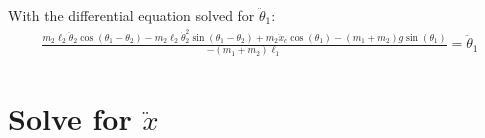 \documentclass[10pt]{article}
\begin{document}
    With the differential equation solved for $\ddot \theta_1$:
    \begin{equation}
        \begin{aligned}
            \frac{m_2\ell_2\ddot\theta_2\cos(\theta_1 - \theta_2)  -m_2\ell_2\dot\theta_2^2\sin(\theta_1-\theta_2)
            +   m_2\ddot x_c\cos(\theta_1) - (m_1 + m_2)g\sin(\theta_1)}{-(m_1 + m_2)\ell_1} = \ddot \theta_1
        \end{aligned}
    \end{equation}  
    
    
    \section{Solve for $\ddot x$}
\end{document}

